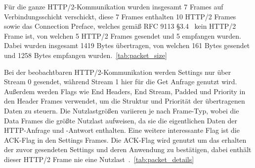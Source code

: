 \FloatBarrier

Für die ganze HTTP/2-Kommunikation wurden insgesamt 7 Frames auf Verbindungsschicht verschickt, diese 7 Frames enthalten 10 HTTP/2 Frames sowie das Connection Preface, welches gemäß RFC 9113 §3.4~\cite{rfc9113_http2_headers} kein HTTP/2 Frame ist, von welchen 5 HTTP/2 Frames gesendet und 5 empfangen wurden.
Dabei wurden insgesamt 1419 Bytes übertragen, von welchen 161 Bytes gesendet und 1258 Bytes empfangen wurden.~\ref{tab:packet_size}

Bei der beobachtbaren HTTP/2-Kommunikation werden Settings nur über Stream 0 gesendet, während Stream 1 hier für die Get Anfrage genutzt wird.
Außerdem werden Flags wie End Headers, End Stream, Padded und Priority in den Header Frames verwendet, um die Struktur und Priorität der übertragenen Daten zu steuern.
Die Nutzlastgrößen variieren je nach Frame-Typ, wobei die Data Frames die größte Nutzlast aufweisen, da sie die eigentlichen Daten der HTTP-Anfrage und -Antwort enthalten.
Eine weitere interessante Flag ist die ACK-Flag in den Settings Frames. Die ACK-Flag wird genutzt um das erhalten der zuvor gesendeten Settings und deren Anwendung zu bestätigen, dabei enthält dieser HTTP/2 Frame nie eine Nutzlast~\cite{rfc9113_http2_headers}.~\ref{tab:packet_details}


